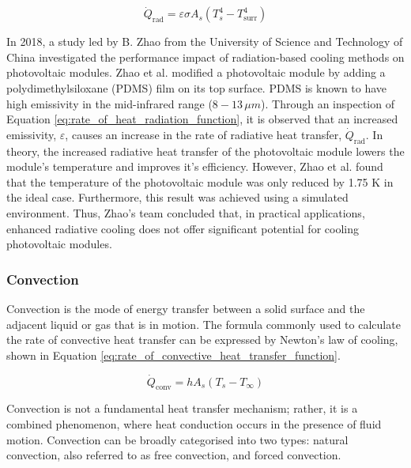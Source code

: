 \begin{equation}
    \dot{Q}_\text{rad} = \varepsilon\sigma A_s (T_s^4-T_\text{surr}^4)
    \label{eq:rate_of_heat_radiation_function}
\end{equation}

In 2018, a study led by B. Zhao from the University of Science and Technology of China investigated the performance impact of radiation-based cooling methods on photovoltaic modules. Zhao et al. modified a photovoltaic module by adding a polydimethylsiloxane (PDMS) film on its top surface. PDMS is known to have high emissivity in the mid-infrared range ($8-13\,\mu m$). \cite{Song2020UltrahighRegime} Through an inspection of Equation \ref{eq:rate_of_heat_radiation_function}, it is observed that an increased emissivity, $\varepsilon$, causes an increase in the rate of radiative heat transfer, $\dot{Q}_\text{rad}$. In theory, the increased radiative heat transfer of the photovoltaic module lowers the module's temperature and improves it's efficiency. However, Zhao et al. found that the temperature of the photovoltaic module was only reduced by 1.75 K in the ideal case. Furthermore, this result was achieved using a simulated environment. Thus, Zhao's team concluded that, in practical applications, enhanced radiative cooling does not offer significant potential for cooling photovoltaic modules. \cite{Zhao2018PerformanceModule}


\subsubsection{Convection}
Convection is the mode of energy transfer between a solid surface and the adjacent liquid or gas that is in motion. The formula commonly used to calculate the rate of convective heat transfer can be expressed by Newton's law of cooling, shown in Equation \ref{eq:rate_of_convective_heat_transfer_function}. \cite{Cengel2014IntroductionConcepts}

\begin{equation}
    \dot{Q}_\text{conv} = hA_s(T_s-T_\infty)
    \label{eq:rate_of_convective_heat_transfer_function}
\end{equation}

Convection is not a fundamental heat transfer mechanism; rather, it is a combined phenomenon, where heat conduction occurs in the presence of fluid motion. Convection can be broadly categorised into two types: natural convection, also referred to as free convection, and forced convection. \cite{Cengel2014FundamentalsConvection}

